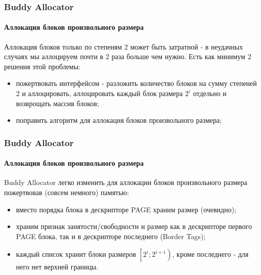 \begin{frame}
\frametitle{Buddy Allocator}
\framesubtitle{Аллокация блоков произвольного размера}

Аллокация блоков только по степеням 2 может быть затратной - в неудачных случаях мы аллоцируем почти в 2 раза больше чем нужно. Есть как минимум 2 решения этой проблемы:

\begin{itemize}
  \item пожертвовать интерфейсом - разложить количество блоков на сумму степеней 2 и аллоцировать, аллоцировать каждый блок размера $2^i$ отдельно и возврощать массив блоков;
  \item поправить алгоритм для аллокация блоков произвольного размера;
\end{itemize}
\end{frame}

\begin{frame}
\frametitle{Buddy Allocator}
\framesubtitle{Аллокация блоков произвольного размера}

Buddy Allocator легко изменить для аллокации блоков произвольного размера пожертвовав (совсем немного) памятью:
\begin{itemize}
  \item вместо порядка блока в дескрипторе PAGE храним размер (очевидно);
  \item храним признак занятости/свободности и размер как в дескрипторе первого PAGE блока, так и в дескрипторе последнего (Border Tags);
  \item каждый список хранит блоки размеров $\left[2^i;2^{i+1}\right)$, кроме последнего - для него нет верхней границы.
\end{itemize}
\end{frame}
